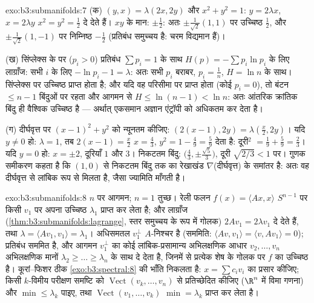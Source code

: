 \begin{solution}{exo:b3:submanifolds:7}
(क) $(y, x) = \lambda(2x, 2y)$ और $x^2 + y^2 = 1$: $y =
2\lambda x$, $x = 2\lambda y$ $x^2 = y^2 = \frac12$ दे देते हैं। $xy$ के मान:
$\pm\frac12$: अतः $\pm\frac1{\sqrt2}(1,1)$ पर उच्चिष्ठ $\frac12$, और $\pm\frac1{\sqrt2}(1,-1)$ पर निम्निष्ठ $-\frac12$
(प्रतिबंध समुच्चय  है: चरम विद्यमान हैं)।

(ख) सिंप्लेक्स के  पर ($p_i > 0$) प्रतिबंध $\sum p_i = 1$ के साथ $H(p) = -\sum p_i\ln p_i$ के
लिए लाग्राँज: सभी $i$ के लिए $-\ln p_i - 1 = \lambda$: अतः सभी $p_i$ बराबर, $p_i =
\frac1n$,
$H = \ln n$ के साथ।  सिंप्लेक्स पर उच्चिष्ठ प्राप्त होता है; और यदि
वह परिसीमा पर प्राप्त होता (कोई $p_i = 0$), तो बंटन $\leq n - 1$ बिंदुओं पर
रहता और आगमन से $H \leq \ln(n-1) < \ln n$: अतः आंतरिक क्रांतिक बिंदु ही वैश्विक उच्चिष्ठ
है --- अर्थात् एकसमान अज्ञान एंट्रॉपी को अधिकतम कर देता है।

(ग)  दीर्घवृत्त पर $(x-1)^2 + y^2$ को न्यूनतम कीजिए: $(2(x{-}1), 2y) = \lambda(\frac x2, 2y)$। यदि $y \neq 0$ हो:
$\lambda = 1$, तब $2(x - 1) = \frac x2$ $x =
\frac43$, $y^2 = 1 - \frac49 = \frac59$ देता है: दूरी$^2$ $=
\frac19 + \frac59 = \frac23$। यदि $y = 0$ हो:
$x = \pm2$, दूरियाँ $1$ और $3$। निकटतम बिंदु: $\bigl(\frac43,
\pm\frac{\sqrt5}3\bigr)$, दूरी $\sqrt{2/3} < 1$ पर।
गुणक समीकरण कहता है कि $(1,0)$ से निकटतम बिंदु तक का रेखाखंड
$\nabla$(दीर्घवृत्त) के समांतर है: अतः वह दीर्घवृत्त से लांबिक रूप से
मिलता है, जैसा ज्यामिति माँगती है।
\end{solution}

\begin{solution}{exo:b3:submanifolds:8}
$n$ पर आगमन; $n = 1$ तुच्छ। रेली फलन $f(x) = \langle Ax, x\rangle$  $S^{n-1}$ पर किसी $v_1$
पर अपना उच्चिष्ठ $\lambda_1$ प्राप्त कर लेता है; और लाग्राँज (\cref{thm:b3:submanifolds:lagrange}, स्तर
समुच्चय के रूप में गोलक) $2Av_1 = 2\lambda v_1$ दे देते हैं, तथा $\lambda = \langle Av_1,
v_1\rangle = \lambda_1$। अधिसमतल $v_1^\perp$
$A$-निश्चर है (सममिति: $\langle Av, v_1\rangle = \langle
v, Av_1\rangle = 0$); प्रतिबंध सममित है, और आगमन $v_1^\perp$
का कोई लांबिक-प्रसामान्य अभिलक्षणिक आधार $v_2, \dots, v_n$ अभिलक्षणिक मानों $\lambda_2 \geq \dots \geq
\lambda_n$
के साथ दे देता है, जिनमें से प्रत्येक शेष  के गोलक पर
$f$ का उच्चिष्ठ है। कूरां--फिशर ठीक \cref{exo:b3:spectral:8} की भाँति निकलता है: $x = \sum c_iv_i$
का प्रसार कीजिए; किसी $k$-विमीय परीक्षण समष्टि को $\operatorname{Vect}(v_k, \dots, v_n)$ से प्रतिच्छेदित
कीजिए ($\R^n$ में विमा गणना) और $\min \leq \lambda_k$ पाइए, तथा $\operatorname{Vect}(v_1, \dots, v_k)$ $\min =
\lambda_k$ प्राप्त
कर लेता है।
\end{solution}

